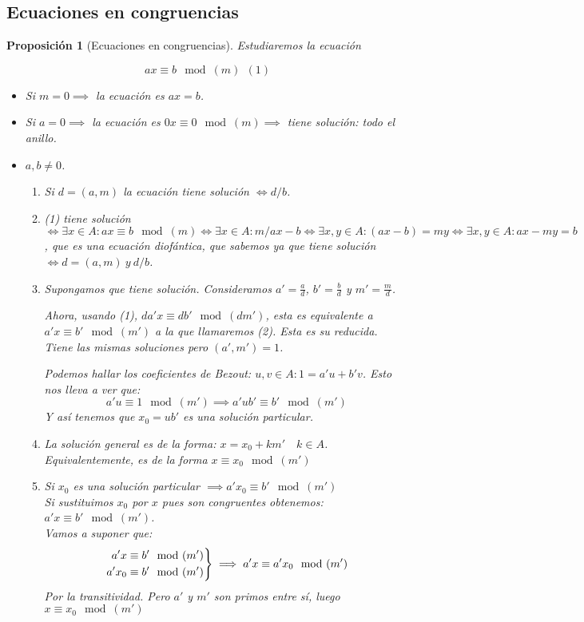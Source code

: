 \documentclass[11pt, a4paper, titlepage]{article}
\makeatletter
\newif\IfInSansMode
\let\oldsf\sffamily
\renewcommand*{\sffamily}{\oldsf\mathversion{sans}\InSansModetrue}
\let\oldnorm\normalfont
\renewcommand*{\normalfont}{\oldnorm\InSansModefalse\mathversion{normal}}
\renewenvironment{proof}[1][\proofname] {\vspace{-15pt}\par\pushQED{\qed}\normalfont\topsep6\p@\@plus6\p@\relax\trivlist\item[\hskip\labelsep\it#1\@addpunct{.}]\ignorespaces}{\popQED\endtrivlist\@endpefalse}
\renewenvironment{proof}[1][\proofname] {\par\pushQED{\qed}\normalfont\topsep6\p@\@plus6\p@\relax\trivlist\item[\hskip\labelsep\itshape\sffamily#1\@addpunct{.}]\ignorespaces}{\popQED\endtrivlist\@endpefalse}
\theoremstyle{theorem-style}
\newtheorem{nprop}{Proposición}[section]
\theoremstyle{definition-style}
\theoremstyle{remark-style}
\theoremstyle{example-style}
\newenvironment{rcases}
  {\left.\begin{aligned}}
  {\end{aligned}\right\rbrace}
\makeatother
\begin{document}
\subsection{Ecuaciones en congruencias}
\begin{nprop}[Ecuaciones en congruencias]

  Estudiaremos la ecuación

  $$ax \equiv b \mod(m) \  \ (1)$$

\begin{itemize}
	\item Si $m = 0 \implies$ la ecuación es $ax = b$.
	\item Si $a = 0\implies $ la ecuación es $0x \equiv 0 \mod(m) \implies$ tiene solución: todo el anillo.
	\item $a,b \ne 0$.
	\begin{enumerate}

	\item Si $d = (a,m)$ la ecuación tiene solución $\iff  d/b$. \\
        \begin{proof}
	(1) tiene solución $\iff \exists x \in A : ax \equiv b\mod(m) \iff \exists x \in A : m/ax-b \iff \exists x,y \in A : (ax-b) = my \iff \exists x,y \in A: ax -my  = b$, que es una ecuación diofántica, que sabemos ya que tiene solución $\iff d =(a,m) \ y  \ d/b$.
\end{proof}
	\item  Supongamos que tiene solución. Consideramos $a'= \frac{a}{d}$, $b'= \frac{b}{d}$ y $m' = \frac{m}{d}$.

	Ahora, usando (1), $da'x \equiv db'\mod(dm')$, esta es equivalente a $a'x \equiv b' \mod(m')$ a la que llamaremos (2). Esta es su reducida. Tiene las mismas soluciones pero $(a',m') = 1$.

	Podemos hallar los coeficientes de Bezout: $u,v \in A :  1 = a'u + b'v$. Esto nos lleva a ver que:
	\[
	a'u \equiv 1 \mod(m') \implies a'ub' \equiv b' \mod(m')
	\]
	Y así tenemos que $x_0 = ub'$ es una solución particular.

	\item La solución general es de la forma: $x = x_0 +km' \quad k \in A$. Equivalentemente, es de la forma $x \equiv x_0 \mod(m')$\\
	\begin{proof}
	Si $x_0$ es una solución particular $\implies a'x_0 \equiv b'\mod(m')$\\
	Si sustituimos $x_0$ por $x$ pues son congruentes obtenemos: $a'x \equiv b' \mod(m')$.\\
	Vamos a suponer que:
	\[
	\begin{rcases}
	a'x \equiv b' \mod(m')\\
	a' x_0 \equiv b' \mod(m')
\end{rcases} \implies a'x \equiv a'x_0 \mod(m')
	\]
Por la transitividad. Pero $a'$ y $m'$ son primos entre sí, luego $x \equiv x_0 \mod(m')$
\end{proof}


\end{enumerate}
\end{itemize}
\end{nprop}
\end{document}
